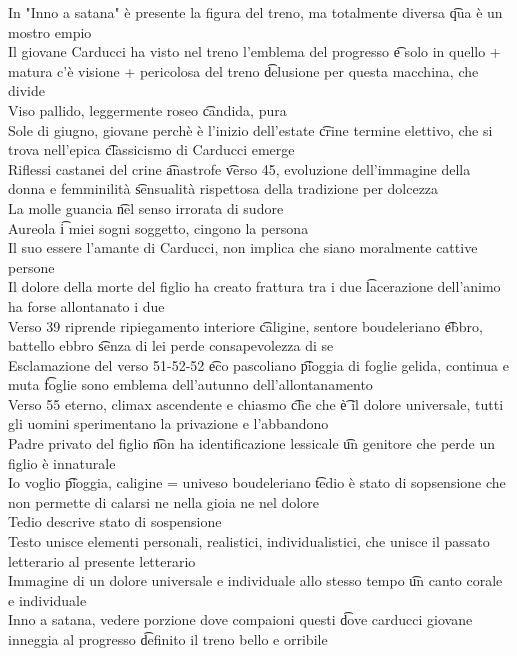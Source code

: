 \documentclass[12pt]{article}
\begin{document}
In "Inno a satana" è presente la figura del treno, ma totalmente diversa \t qua è un mostro empio \\
Il giovane Carducci ha visto nel treno l'emblema del progresso \t e solo in quello + matura c'è visione + pericolosa del treno \t delusione per questa macchina, che divide \\
Viso pallido, leggermente roseo \t candida, pura \\
Sole di giugno, giovane perchè è l'inizio dell'estate \t crine termine elettivo, che si trova nell'epica \t classicismo di Carducci emerge \\
Riflessi castanei del crine \t anastrofe \t verso 45, evoluzione dell'immagine della donna e femminilità \t sensualità rispettosa della tradizione per dolcezza \\
La molle guancia \t nel senso irrorata di sudore \\
Aureola \t i miei sogni soggetto, cingono la persona \\
Il suo essere l'amante di Carducci, non implica che siano moralmente cattive persone \\
Il dolore della morte del figlio ha creato frattura tra i due \t lacerazione dell'animo ha forse allontanato i due \\
Verso 39 riprende ripiegamento interiore \t caligine, sentore boudeleriano \t ebbro, battello ebbro \t senza di lei perde consapevolezza di se \\
Esclamazione del verso 51-52-52 \t eco pascoliano \t pioggia di foglie gelida, continua e muta \t foglie sono emblema dell'autunno dell'allontanamento \\
Verso 55 eterno, climax ascendente e chiasmo \t che che \t è il dolore universale, tutti gli uomini sperimentano la privazione e l'abbandono \\
Padre privato del figlio \t non ha identificazione lessicale \t un genitore che perde un figlio è innaturale \\
Io voglio \t pioggia, caligine = univeso boudeleriano \t tedio è stato di sopsensione che non permette di calarsi ne nella gioia ne nel dolore \\
Tedio descrive stato di sospensione \\
Testo unisce elementi personali, realistici, individualistici, che unisce il passato letterario al presente letterario \\
Immagine di un dolore universale e individuale allo stesso tempo \t un canto corale e individuale \\
Inno a satana, vedere porzione dove compaioni questi \t dove carducci giovane inneggia al progresso \t definito il treno bello e orribile
\end{document}
